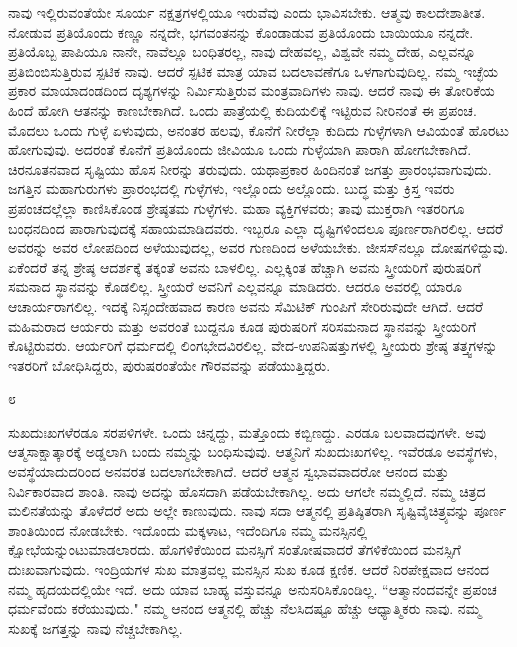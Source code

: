 ನಾವು ಇಲ್ಲಿರುವಂತೆಯೇ ಸೂರ್ಯ ನಕ್ಷತ್ರಗಳಲ್ಲಿಯೂ ಇರುವೆವು ಎಂದು ಭಾವಿಸಬೇಕು. ಆತ್ಮವು ಕಾಲದೇಶಾತೀತ. ನೋಡುವ ಪ್ರತಿಯೊಂದು ಕಣ್ಣೂ ನನ್ನದೇ, ಭಗವಂತನನ್ನು ಕೊಂಡಾಡುವ ಪ್ರತಿಯೊಂದು ಬಾಯಿಯೂ ನನ್ನದೇ. ಪ್ರತಿಯೊಬ್ಬ ಪಾಪಿಯೂ ನಾನೇ, ನಾವೆಲ್ಲೂ ಬಂಧಿತರಲ್ಲ, ನಾವು ದೇಹವಲ್ಲ, ವಿಶ್ವವೇ ನಮ್ಮ ದೇಹ, ಎಲ್ಲವನ್ನೂ ಪ್ರತಿಬಿಂಬಿಸುತ್ತಿರುವ ಸ್ಪಟಿಕ ನಾವು. ಆದರೆ ಸ್ಪಟಿಕ ಮಾತ್ರ ಯಾವ ಬದಲಾವಣೆಗೂ ಒಳಗಾಗುವುದಿಲ್ಲ. ನಮ್ಮ ಇಚ್ಛೆಯ ಪ್ರಕಾರ ಮಾಯಾದಂಡದಿಂದ ದೃಶ್ಯಗಳನ್ನು ನಿರ್ಮಿಸುತ್ತಿರುವ ಮಂತ್ರವಾದಿಗಳು ನಾವು. ಆದರೆ ನಾವು ಈ ತೋರಿಕೆಯ ಹಿಂದೆ ಹೋಗಿ ಆತನನ್ನು ಕಾಣಬೇಕಾಗಿದೆ. ಒಂದು ಪಾತ್ರೆಯಲ್ಲಿ ಕುದಿಯಲಿಕ್ಕೆ ಇಟ್ಟಿರುವ ನೀರಿನಂತೆ ಈ ಪ್ರಪಂಚ. ಮೊದಲು ಒಂದು ಗುಳ್ಳೆ ಏಳುವುದು, ಅನಂತರ ಹಲವು, ಕೊನೆಗೆ ನೀರೆಲ್ಲಾ ಕುದಿದು ಗುಳ್ಳೆಗಳಾಗಿ ಆವಿಯಂತೆ ಹೊರಟು ಹೋಗುವುವು. ಅದರಂತೆ ಕೊನೆಗೆ ಪ್ರತಿಯೊಂದು ಜೀವಿಯೂ ಒಂದು ಗುಳ್ಳೆಯಾಗಿ ಪಾರಾಗಿ ಹೋಗಬೇಕಾಗಿದೆ. ಚಿರನೂತನವಾದ ಸೃಷ್ಟಿಯು ಹೊಸ ನೀರನ್ನು ತರುವುದು. ಯಥಾಪ್ರಕಾರ ಹಿಂದಿನಂತೆ ಜಗತ್ತು ಪ್ರಾರಂಭವಾಗುವುದು. ಜಗತ್ತಿನ ಮಹಾಗುರುಗಳು ಪ್ರಾರಂಭದಲ್ಲಿ ಗುಳ್ಳೆಗಳು, ಇಲ್ಲೊಂದು ಅಲ್ಲೊಂದು. ಬುದ್ಧ ಮತ್ತು ಕ್ರಿಸ್ತ ಇವರು ಪ್ರಪಂಚದಲ್ಲೆಲ್ಲಾ ಕಾಣಿಸಿಕೊಂಡ ಶ್ರೇಷ್ಠತಮ ಗುಳ್ಳೆಗಳು. ಮಹಾ ವ್ಯಕ್ತಿಗಳವರು; ತಾವು ಮುಕ್ತರಾಗಿ ಇತರರಿಗೂ ಬಂಧನದಿಂದ ಪಾರಾಗುವುದಕ್ಕೆ ಸಹಾಯಮಾಡಿದವರು. ಇಬ್ಬರೂ ಎಲ್ಲಾ ದೃಷ್ಟಿಗಳಿಂದಲೂ ಪೂರ್ಣರಾಗಿರಲಿಲ್ಲ. ಆದರೆ ಅವರನ್ನು ಅವರ ಲೋಪದಿಂದ ಅಳೆಯುವುದಲ್ಲ, ಅವರ ಗುಣದಿಂದ ಅಳೆಯಬೇಕು. ಜೀಸಸ್‌ನಲ್ಲೂ ದೋಷಗಳಿದ್ದುವು. ಏಕೆಂದರೆ ತನ್ನ ಶ್ರೇಷ್ಠ ಆದರ್ಶಕ್ಕೆ ತಕ್ಕಂತೆ ಅವನು ಬಾಳಲಿಲ್ಲ. ಎಲ್ಲಕ್ಕಿಂತ ಹೆಚ್ಚಾಗಿ ಅವನು ಸ್ತ್ರೀಯರಿಗೆ ಪುರುಷರಿಗೆ ಸಮನಾದ ಸ್ಥಾನವನ್ನು ಕೊಡಲಿಲ್ಲ. ಸ್ತ್ರೀಯರೆ ಅವನಿಗೆ ಎಲ್ಲವನ್ನೂ ಮಾಡಿದರು. ಆದರೂ ಅವರಲ್ಲಿ ಯಾರೂ ಆಚಾರ್ಯರಾಗಲಿಲ್ಲ. ಇದಕ್ಕೆ ನಿಸ್ಸಂದೇಹವಾದ ಕಾರಣ ಅವನು ಸೆಮಿಟಿಕ್ ಗುಂಪಿಗೆ ಸೇರಿರುವುದೇ ಆಗಿದೆ. ಆದರೆ ಮಹಿಮರಾದ ಆರ್ಯರು ಮತ್ತು ಅವರಂತೆ ಬುದ್ದನೂ ಕೂಡ ಪುರುಷರಿಗೆ ಸರಿಸಮನಾದ ಸ್ಥಾನವನ್ನು ಸ್ತ್ರೀಯರಿಗೆ ಕೊಟ್ಟಿರುವರು. ಆರ್ಯರಿಗೆ ಧರ್ಮದಲ್ಲಿ ಲಿಂಗಭೇದವಿರಲಿಲ್ಲ. ವೇದ-ಉಪನಿಷತ್ತುಗಳಲ್ಲಿ ಸ್ತ್ರೀಯರು ಶ್ರೇಷ್ಠ ತತ್ತ್ವಗಳನ್ನು ಇತರರಿಗೆ ಬೋಧಿಸಿದ್ದರು, ಪುರುಷರಂತೆಯೇ ಗೌರವವನ್ನು ಪಡೆಯುತ್ತಿದ್ದರು.

\begin{center}
೮
\end{center}

ಸುಖದುಃಖಗಳೆರಡೂ ಸರಪಳಿಗಳೇ. ಒಂದು ಚಿನ್ನದ್ದು, ಮತ್ತೊಂದು ಕಬ್ಬಿಣದ್ದು. ಎರಡೂ ಬಲವಾದವುಗಳೇ. ಅವು ಆತ್ಮಸಾಕ್ಷಾತ್ಕಾರಕ್ಕೆ ಅಡ್ಡಲಾಗಿ ಬಂದು ನಮ್ಮನ್ನು ಬಂಧಿಸುವುವು. ಆತ್ಮನಿಗೆ ಸುಖದುಃಖಗಳಿಲ್ಲ. ಇವೆರಡೂ ಅವಸ್ಥೆಗಳು, ಅವಸ್ಥೆಯಾದುದರಿಂದ ಅನವರತ ಬದಲಾಗಬೇಕಾಗಿದೆ. ಆದರೆ ಆತ್ಮನ ಸ್ವಭಾವವಾದರೋ ಆನಂದ ಮತ್ತು ನಿರ್ವಿಕಾರವಾದ ಶಾಂತಿ. ನಾವು ಅದನ್ನು ಹೊಸದಾಗಿ ಪಡೆಯಬೇಕಾಗಿಲ್ಲ. ಅದು ಆಗಲೇ ನಮ್ಮಲ್ಲಿದೆ. ನಮ್ಮ ಚಿತ್ರದ ಮಲಿನತೆಯನ್ನು ತೊಳೆದರೆ ಅದು ಅಲ್ಲೇ ಕಾಣುವುದು. ನಾವು ಸದಾ ಆತ್ಮನಲ್ಲಿ ಪ್ರತಿಷ್ಠಿತರಾಗಿ ಸೃಷ್ಟಿವೈಚಿತ್ರ್ಯವನ್ನು ಪೂರ್ಣ ಶಾಂತಿಯಿಂದ ನೋಡಬೇಕು. ಇದೊಂದು ಮಕ್ಕಳಾಟ, ಇದೆಂದಿಗೂ ನಮ್ಮ ಮನಸ್ಸಿನಲ್ಲಿ ಕ್ಷೋಭೆಯನ್ನುಂಟುಮಾಡಲಾರದು. ಹೊಗಳಿಕೆಯಿಂದ ಮನಸ್ಸಿಗೆ ಸಂತೋಷವಾದರೆ ತೆಗಳಿಕೆಯಿಂದ ಮನಸ್ಸಿಗೆ ದುಃಖವಾಗುವುದು. ಇಂದ್ರಿಯಗಳ ಸುಖ ಮಾತ್ರವಲ್ಲ ಮನಸ್ಸಿನ ಸುಖ ಕೂಡ ಕ್ಷಣಿಕ. ಆದರೆ ನಿರಪೇಕ್ಷವಾದ ಆನಂದ ನಮ್ಮ ಹೃದಯದಲ್ಲಿಯೇ ಇದೆ. ಅದು ಯಾವ ಬಾಹ್ಯ ವಸ್ತುವನ್ನೂ ಅನುಸರಿಸಿಕೊಂಡಿಲ್ಲ. “ಆತ್ಮಾನಂದವನ್ನೇ ಪ್ರಪಂಚ ಧರ್ಮವೆಂದು ಕರೆಯುವುದು." ನಮ್ಮ ಆನಂದ ಆತ್ಮನಲ್ಲಿ ಹೆಚ್ಚು ನೆಲಸಿದಷ್ಟೂ ಹೆಚ್ಚು ಆಧ್ಯಾತ್ಮಿಕರು ನಾವು. ನಮ್ಮ ಸುಖಕ್ಕೆ ಜಗತ್ತನ್ನು ನಾವು ನೆಚ್ಚಬೇಕಾಗಿಲ್ಲ.

